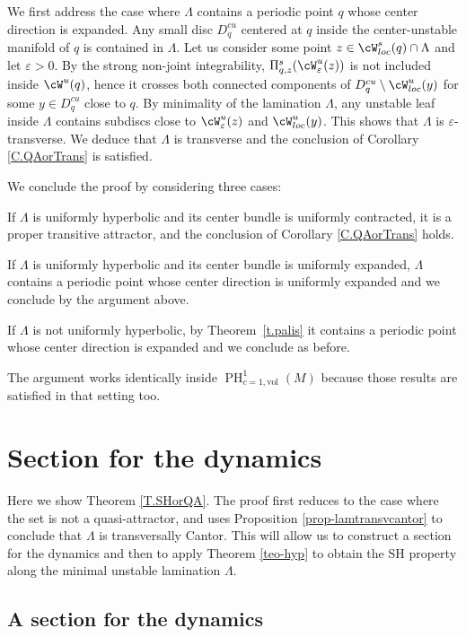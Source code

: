 \documentclass[a4paper,11pt]{amsart}
\numberwithin{equation}{section}     %
\theoremstyle{definition}
\theoremstyle{remark}
\DeclareMathOperator{\PH}{PH}
\begin{document}
We first address the case where $\Lambda$ contains a periodic point $q$ whose center direction is expanded.
Any small disc $D^{cu}_q$ centered at $q$ inside the center-unstable manifold of $q$ is contained in $\Lambda$.
Let us consider some point $z\in \cW^s_{loc}(q)\cap \Lambda$ and let $\varepsilon>0$. By the strong non-joint integrability, $\Pi^s_{q,z}(\cW^u_{\varepsilon}(z))$ is not included inside $\cW^u(q)$, hence it crosses both connected components of $D^{cu}_q\setminus \cW^u_{loc}(y)$ for some $y\in D^{cu}_q$ close to $q$.
By minimality of the lamination $\Lambda$, any unstable leaf inside $\Lambda$ contains subdiscs close to $\cW^u_{\varepsilon}(z)$ and $\cW^u_{loc}(y)$. This shows that $\Lambda$ is $\varepsilon$-transverse. We deduce that $\Lambda$ is transverse and the conclusion of Corollary \ref{C.QAorTrans} is satisfied.
\smallskip

We conclude the proof by considering three cases:

If $\Lambda$ is uniformly hyperbolic and its center bundle is uniformly contracted, it is a proper transitive attractor, and the conclusion of Corollary \ref{C.QAorTrans} holds.

If $\Lambda$ is uniformly hyperbolic and its center bundle is uniformly expanded, $\Lambda$ contains a periodic point whose center direction is uniformly expanded and we conclude by the argument above.

If $\Lambda$ is not uniformly hyperbolic, by Theorem~\ref{t.palis} it contains a periodic point whose center direction is expanded and we conclude as before.
\smallskip

The argument works identically inside $\PH^1_{c=1,\mathrm{vol}}(M)$ because those results are satisfied in that setting too. 


\section{Section for the dynamics}\label{s.sectiondynamics}

Here we show Theorem \ref{T.SHorQA}. The proof first reduces to the case where the set is not a quasi-attractor, and uses Proposition \ref{prop-lamtransvcantor} to conclude that $\Lambda$ is transversally Cantor. This will allow us to construct a section for the dynamics and then to apply Theorem \ref{teo-hyp} to obtain the SH property along the minimal unstable lamination $\Lambda$.

\subsection{A section for the dynamics}
\end{document}
